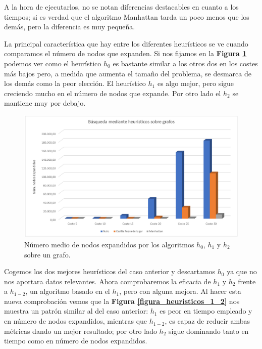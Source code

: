 \documentclass[runningheads]{llncs}
\begin{document}
A la hora de ejecutarlos, no se notan diferencias destacables en cuanto a los tiempos; si es verdad que el algoritmo Manhattan tarda un poco menos que los demás, pero la diferencia es muy pequeña.

La principal característica que hay entre los diferentes heurísticos se ve cuando comparamos el número de nodos que expanden. Si nos fijamos en la \textbf{Figura \ref{figura_heuristicos_basico}} podemos ver como el heurístico $ h_0 $ es bastante similar a los otros dos en los costes más bajos pero, a medida que aumenta el tamaño del problema, se desmarca de los demás como la peor elección. El heurístico $ h_1 $ es algo mejor, pero sigue creciendo mucho en el número de nodos que expande. Por otro lado el $ h_2 $ se mantiene muy por debajo.

\begin{figure}
	\centering
	\includegraphics[width=\textwidth]{ejercicio3.jpg}
	\caption{Número medio de nodos expandidos por los algoritmos $ h_0 $, $ h_1 $ y $ h_2 $ sobre un grafo.} 
	\label{figura_heuristicos_basico}
\end{figure}

Cogemos los dos mejores heurísticos del caso anterior y descartamos $ h_0 $ ya que no nos aportara datos relevantes. Ahora comprobaremos la eficacia de $ h_1 $ y $ h_2 $ frente a $ h_{1-2} $, un algoritmo basado en el $ h_1 $, pero con alguna mejora. Al hacer esta nueva comprobación vemos que la \textbf{Figura \ref{figura_heuristicos_1_2}} nos muestra un patrón similar al del caso anterior: $ h_1 $ es peor en tiempo empleado y en número de nodos expandidos, mientras que $ h_{1-2} $, es capaz de reducir ambas métricas dando un mejor resultado; por otro lado $ h_2 $ sigue dominando tanto en tiempo como en número de nodos expandidos.
\end{document}

